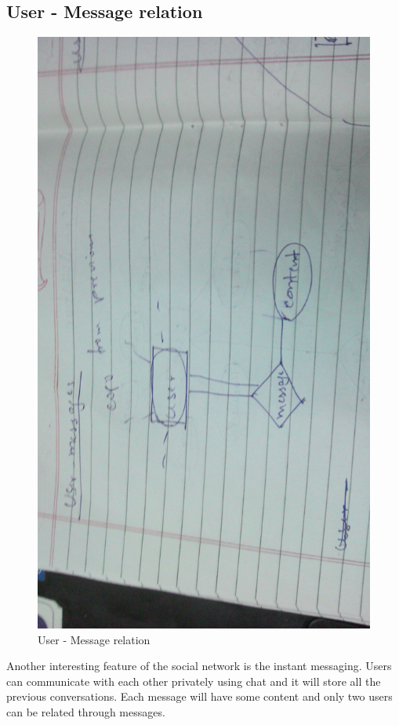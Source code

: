 \documentclass{article}
\begin{document}
\subsection{User - Message relation}
\begin{figure}[h]
\centering
\includegraphics[scale=0.2]{fig6.jpg}
\caption{User - Message relation}
\label{fig6}
\end{figure}
Another interesting feature of the social network is the instant messaging. Users can communicate with each other privately using chat and it will store all the previous conversations. Each message will have some content and only two users can be related through messages.
\end{document}
